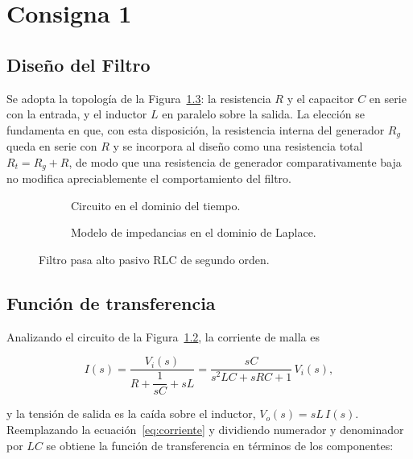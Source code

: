 \chapter{Consigna 1}
\label{chap:diseno}

\section{Diseño del Filtro}

Se adopta la topología de la Figura~\ref{fig:circuito}: la resistencia $R$ y el capacitor $C$ en serie con
la entrada, y el inductor $L$ en paralelo sobre la salida. La elección se fundamenta en que, con esta
disposición, la resistencia interna del generador $R_g$ queda en serie con $R$ y se incorpora al diseño
como una resistencia total $R_t = R_g + R$, de modo que una resistencia de generador comparativamente baja
no modifica apreciablemente el comportamiento del filtro.

\begin{figure}[!ht]
  \centering
  \begin{subfigure}[t]{0.48\textwidth}
    \centering
    
    \caption{Circuito en el dominio del tiempo.}
    \label{crkt:pasa-alto}
  \end{subfigure}
  \hfill
  \begin{subfigure}[t]{0.48\textwidth}
    \centering
    
    \caption{Modelo de impedancias en el dominio de Laplace.}
    \label{crkt:laplace}
  \end{subfigure}
  \caption{Filtro pasa alto pasivo RLC de segundo orden.}
  \label{fig:circuito}
\end{figure}

\section{Función de transferencia}

Analizando el circuito de la Figura~\ref{crkt:laplace}, la corriente de malla es

\begin{equation}
  I(s) = \frac{V_i(s)}{R + \dfrac{1}{sC} + sL} = \frac{sC}{s^2 LC + sRC + 1}\, V_i(s),
  \label{eq:corriente}
\end{equation}

y la tensión de salida es la caída sobre el inductor, $V_o(s) = sL\, I(s)$. Reemplazando la
ecuación~\eqref{eq:corriente} y dividiendo numerador y denominador por $LC$ se obtiene la función de
transferencia en términos de los componentes:

